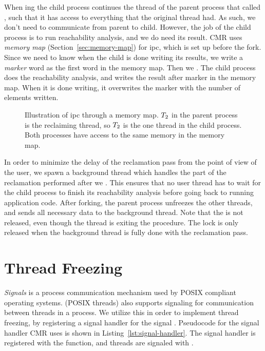 When ing the child process continues the thread of the parent process that called
, such that it has access to everything that the original thread had.
As such, we don't need to communicate from parent to child. However, the job of the child process
is to run reachability analysis, and we do need its result. CMR uses \emph{memory map}
(Section~\ref{sec:memory-map}) for \gls{ipc}\@, which is set up before the fork. Since we need to
know when the child is done writing its results, we write a \emph{marker} word as the first word in
the memory map. Then we . The child process does the reachability analysis, and
writes the result after marker in the memory map. When it is done writing, it overwrites the marker
with the number of elements written.

\begin{figure}[b]
  \centering
  
  \caption{Illustration of \gls{ipc} through a memory map. $T\sb{2}$ in the parent process is the
  reclaiming thread, so $T\sb{2}$ is the one thread in the child process. Both processes have
  access to the same memory in the memory map.}
\end{figure}

In order to minimize the delay of the reclamation pass from the point of view of the user, we spawn
a background thread which handles the part of the reclamation performed after we .
This ensures that no user thread has to wait for the child process to finish its reachability
analysis before going back to running application code.  After forking, the parent process
unfreezes the other threads, and sends all necessary data to the background thread. Note that the
 is not released, even though the thread is exiting the procedure. The lock is
only released when the background thread is fully done with the reclamation pass.

\section{Thread Freezing\label{sec:signals}}

\emph{Signals} is a process communication mechanism used by POSIX compliant operating systems.
 (POSIX threads) also supports signaling for communication between threads in a
process. We utilize this in order to implement thread freezing, by registering a signal handler for
the signal . Pseudocode for the signal handler CMR uses is shown in
Listing~\ref{lst:signal-handler}. The signal handler is registered with the 
function, and threads are signaled with .

